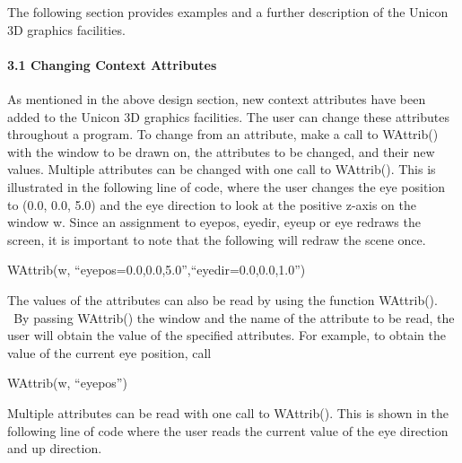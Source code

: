 \documentclass[letterpaper]{article}
\begin{document}
\bigskip



\bigskip

{
The following section provides examples and a further description of the Unicon 3D graphics facilities. }


\bigskip

\paragraph[3.1 Changing Context Attributes]{\bfseries 3.1 Changing Context Attributes}

\bigskip

{
As mentioned in the above design section, new context attributes have been added to the Unicon 3D graphics facilities.
The user can change these attributes throughout a program. To change from an attribute, make a call to
\textsf{WAttrib()} with the window to be drawn on, the attributes to be changed, and their new values. Multiple
attributes can be changed with one call to \textsf{WAttrib()}. This is illustrated in the following line of code, where
the user changes the eye position to \textsf{(0.0, 0.0, 5.0)} and the eye direction to look at the positive z-axis on
the window w. Since an assignment to \textsf{eyepos}, \textsf{eyedir}, \textsf{eyeup} or \textsf{eye} redraws the
screen, it is important to note that the following will redraw the scene once. }


\bigskip

{\sffamily
WAttrib(w, ``eyepos=0.0,0.0,5.0'',``eyedir=0.0,0.0,1.0'')}


\bigskip

{
The values of the attributes can also be read by using the function \textsf{WAttrib()}.\texttt{ \ }By passing
\textsf{WAttrib()} the window and the name of the attribute to be read, the user will obtain the value of the specified
attributes. For example, to obtain the value of the current eye position, call \ }


\bigskip

{\sffamily
WAttrib(w, ``eyepos'')}


\bigskip

{
Multiple attributes can be read with one call to \textsf{WAttrib()}. This is shown in the following line of code where
the user reads the current value of the eye direction and up direction. }
\end{document}
